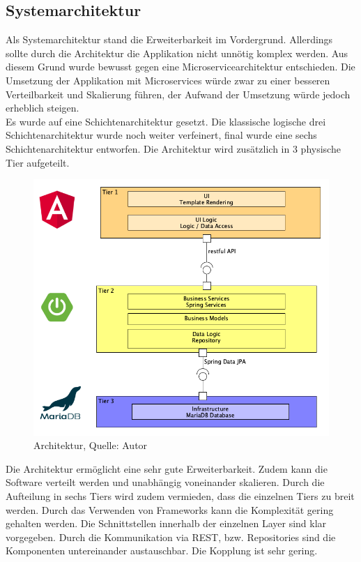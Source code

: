 \subsection{Systemarchitektur}
Als Systemarchitektur stand die Erweiterbarkeit im Vordergrund. Allerdings sollte durch die Architektur die Applikation nicht unnötig komplex werden. Aus diesem Grund wurde bewusst gegen eine Microservicearchitektur entschieden. Die Umsetzung der Applikation mit Microservices würde zwar zu einer besseren Verteilbarkeit und Skalierung führen, der Aufwand der Umsetzung würde jedoch erheblich steigen. \\
Es wurde auf eine Schichtenarchitektur gesetzt. Die klassische logische drei Schichtenarchitektur wurde noch weiter verfeinert, final wurde eine sechs Schichtenarchitektur entworfen. Die Architektur wird zusätzlich in 3 physische Tier aufgeteilt. 
\begin{figure}[H]
	\centering
	\includegraphics[width=\linewidth]{images/architectureWithImages.png}
	\caption[Architektur]{Architektur, Quelle: Autor}
	\label{img: Architektur}
\end{figure}
Die Architektur ermöglicht eine sehr gute Erweiterbarkeit. Zudem kann die Software verteilt werden und unabhängig voneinander skalieren. Durch die Aufteilung in sechs Tiers wird zudem vermieden, dass die einzelnen Tiers zu breit werden. Durch das Verwenden von Frameworks kann die Komplexität gering gehalten werden. Die Schnittstellen innerhalb der einzelnen Layer sind klar vorgegeben. Durch die Kommunikation via REST, bzw. Repositories sind die Komponenten untereinander austauschbar. Die Kopplung ist sehr gering. 

